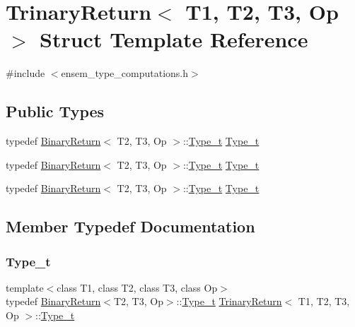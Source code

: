 \hypertarget{structTrinaryReturn}{}\section{Trinary\+Return$<$ T1, T2, T3, Op $>$ Struct Template Reference}
\label{structTrinaryReturn}


{\ttfamily \#include $<$ensem\+\_\+type\+\_\+computations.\+h$>$}

\subsection*{Public Types}
\begin{DoxyCompactItemize}
\item 
typedef \mbox{\hyperlink{structBinaryReturn}{Binary\+Return}}$<$ T2, T3, Op $>$\+::\mbox{\hyperlink{structTrinaryReturn_ac67f5482a7fd12139d0cc6b5ec1cc374}{Type\+\_\+t}} \mbox{\hyperlink{structTrinaryReturn_ac67f5482a7fd12139d0cc6b5ec1cc374}{Type\+\_\+t}}
\item 
typedef \mbox{\hyperlink{structBinaryReturn}{Binary\+Return}}$<$ T2, T3, Op $>$\+::\mbox{\hyperlink{structTrinaryReturn_ac67f5482a7fd12139d0cc6b5ec1cc374}{Type\+\_\+t}} \mbox{\hyperlink{structTrinaryReturn_ac67f5482a7fd12139d0cc6b5ec1cc374}{Type\+\_\+t}}
\item 
typedef \mbox{\hyperlink{structBinaryReturn}{Binary\+Return}}$<$ T2, T3, Op $>$\+::\mbox{\hyperlink{structTrinaryReturn_ac67f5482a7fd12139d0cc6b5ec1cc374}{Type\+\_\+t}} \mbox{\hyperlink{structTrinaryReturn_ac67f5482a7fd12139d0cc6b5ec1cc374}{Type\+\_\+t}}
\end{DoxyCompactItemize}


\subsection{Member Typedef Documentation}
\mbox{\label{structTrinaryReturn_ac67f5482a7fd12139d0cc6b5ec1cc374}} 
\subsubsection{\texorpdfstring{Type\_t}{Type\_t}\hspace{0.1cm}{\footnotesize\ttfamily [1/3]}}
{\footnotesize\ttfamily template$<$class T1, class T2, class T3, class Op$>$ \\
typedef \mbox{\hyperlink{structBinaryReturn}{Binary\+Return}}$<$T2, T3, Op$>$\+::\mbox{\hyperlink{structTrinaryReturn_ac67f5482a7fd12139d0cc6b5ec1cc374}{Type\+\_\+t}} \mbox{\hyperlink{structTrinaryReturn}{Trinary\+Return}}$<$ T1, T2, T3, Op $>$\+::\mbox{\hyperlink{structTrinaryReturn_ac67f5482a7fd12139d0cc6b5ec1cc374}{Type\+\_\+t}}}

